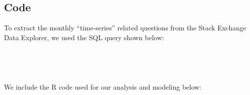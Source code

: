\documentclass[10pt]{article}
\begin{document}
\FloatBarrier

\subsection*{Code}

To extract the monthly ``time-series'' related questions from the Stack Exchange Data Explorer, we used the SQL query shown below:

\



\


We include the R code used for our analysis and modeling below:

\


\end{document}
